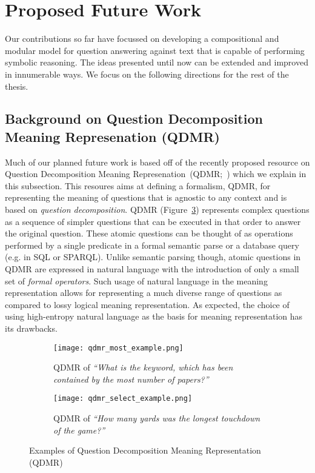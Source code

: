\documentclass[main.tex]{subfiles}
\begin{document}
\section{Proposed Future Work} %
\label{sec:future}

Our contributions so far have focussed on developing a compositional and modular model for question answering against text that is capable of performing symbolic reasoning. The ideas presented until now can be extended and improved in innumerable ways. We focus on the following directions for the rest of the thesis.

\subsection{Background on Question Decomposition Meaning Represenation (QDMR)}
Much of our planned future work is based off of the recently proposed resource on Question Decomposition Meaning Represenation~(QDMR;~) which we explain in this subsection.
This resoures aims at defining a formalism, QDMR, for representing the meaning of questions that is agnostic to any context and is based on \textit{question decomposition}.
QDMR (Figure~\ref{fig:qdmr_examples}) represents complex questions as a sequence of simpler questions that can be executed in that order to answer the original question.
These atomic questions can be thought of as operations performed by a single predicate in a formal semantic parse or a database query (e.g. in SQL or SPARQL).
Unlike semantic parsing though, atomic questions in QDMR are expressed in natural language with the introduction of only a small set of \textit{formal operators}.  Such usage of natural language in the meaning representation allows for representing a much diverse range of questions as compared to lossy logical meaning representation. As expected, the choice of using high-entropy natural language as the basis for meaning representation has its drawbacks.

\begin{figure}[b]
	\centering
    \begin{subfigure}[tb]{0.45\linewidth}
		\texttt{[image: qdmr\_most\_example.png]}
        \caption{QDMR of \textit{``What is the keyword, which has been contained by the most number of papers?''}}
		\label{fig:qdmr_most}
	\end{subfigure}
    \hfill
    \begin{subfigure}[tb]{0.45\linewidth}
		\texttt{[image: qdmr\_select\_example.png]}
		\caption{QDMR of \textit{``How many yards was the longest touchdown of the game?''}}
        \label{fig:qdmr_select}
    \end{subfigure}
	\caption{Examples of Question Decomposition Meaning Representation (QDMR)}
	\label{fig:qdmr_examples}
\end{figure}
\end{document}

